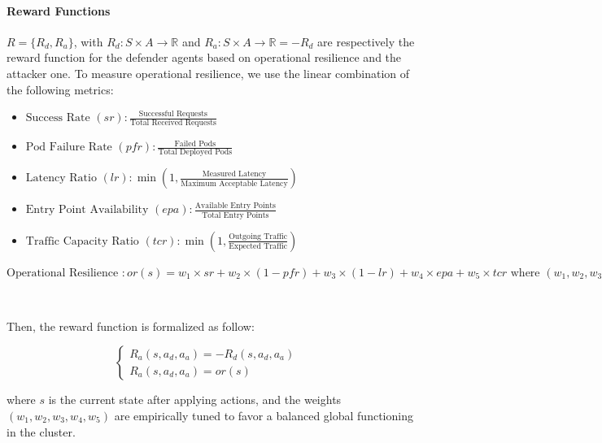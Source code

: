 \noindent \paragraph{\textbf{Reward Functions}} $R = \{R_d, R_a\}$, with $R_d: S \times A \to \mathbb{R}$ and $R_a: S \times A \to \mathbb{R} = - R_d$ are respectively the reward function for the defender agents based on operational resilience and the attacker one.
To measure operational resilience, we use the linear combination of the following metrics:
%
\begin{itemize}
    \vspace{0.15cm}
    \item $\text{Success Rate } (sr) : \frac{\text{Successful Requests}}{\text{Total Received Requests}}$
    \vspace{0.15cm}
    \item $\text{Pod Failure Rate } (pfr) : \frac{\text{Failed Pods}}{\text{Total Deployed Pods}}$
    \vspace{0.15cm}
    \item $\text{Latency Ratio } (lr) : \min\left(1,\frac{\text{Measured Latency}}{\text{Maximum Acceptable Latency}}\right)$
    \vspace{0.15cm}    
    \item $\text{Entry Point Availability } (epa) : \frac{\text{Available Entry Points}}{\text{Total Entry Points}}$
    \vspace{0.15cm}
    \item $\text{Traffic Capacity Ratio } (tcr) : \min\left(1, \frac{\text{Outgoing Traffic}}{\text{Expected Traffic}}\right)$
\end{itemize}

\vspace{0.3cm}

$\text{Operational Resilience }: or(s) = w_1 \times sr
\allowbreak + w_2 \times (1 - pfr)
\allowbreak + w_3 \times (1 - lr)
\allowbreak + w_4 \times epa
\allowbreak + w_5 \times tcr
\text{ where } (w_1, w_2, w_3, w_4, w_5) \text{ are relative weights.}$

\

Then, the reward function is formalized as follow:

$$
\begin{cases} 
    R_a(s, a_d, a_a) = -R_d(s, a_d, a_a) & \\
    R_a(s, a_d, a_a) = or(s)
\end{cases}
$$

where $s$ is the current state after applying actions, and the weights $(w_1, w_2, w_3, w_4, w_5)$ are empirically tuned to favor a balanced global functioning in the cluster.


